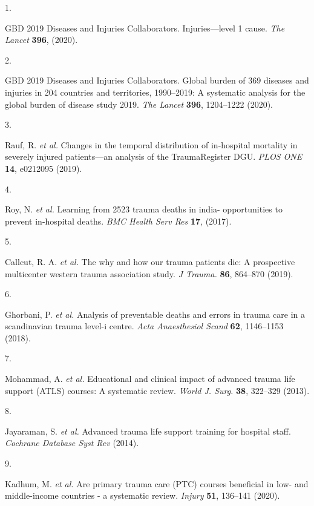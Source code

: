 \documentclass[
]{scrartcl}
\newlength{\cslhangindent}
\newlength{\csllabelwidth}
\newlength{\cslentryspacingunit} %
\newenvironment{CSLReferences}[2] %
 {%
  \setlength{\parindent}{0pt}
  \ifodd #1
  \let\oldpar\par
  \def\par{\hangindent=\cslhangindent\oldpar}
  \fi
  \setlength{\parskip}{#2\cslentryspacingunit}
 }%
 {}
\newcommand{\CSLLeftMargin}[1]{\parbox[t]{\csllabelwidth}{#1}}
\newcommand{\CSLRightInline}[1]{\parbox[t]{\linewidth - \csllabelwidth}{#1}\break}
\begin{document}
\hypertarget{refs}{}
\begin{CSLReferences}{0}{0}
\leavevmode{}%
\CSLLeftMargin{1. }%
\CSLRightInline{GBD 2019 Diseases and Injuries Collaborators.
Injuries---level 1 cause. \emph{The Lancet} \textbf{396}, (2020).}

\leavevmode{}%
\CSLLeftMargin{2. }%
\CSLRightInline{GBD 2019 Diseases and Injuries Collaborators. Global
burden of 369 diseases and injuries in 204 countries and territories,
1990--2019: A systematic analysis for the global burden of disease study
2019. \emph{The Lancet} \textbf{396}, 1204--1222 (2020).}

\leavevmode{}%
\CSLLeftMargin{3. }%
\CSLRightInline{Rauf, R. \emph{et al.} Changes in the temporal
distribution of in-hospital mortality in severely injured patients---an
analysis of the TraumaRegister DGU. \emph{PLOS ONE} \textbf{14},
e0212095 (2019).}

\leavevmode{}%
\CSLLeftMargin{4. }%
\CSLRightInline{Roy, N. \emph{et al.} Learning from 2523 trauma deaths
in india- opportunities to prevent in-hospital deaths. \emph{BMC Health
Serv Res} \textbf{17}, (2017).}

\leavevmode{}%
\CSLLeftMargin{5. }%
\CSLRightInline{Callcut, R. A. \emph{et al.} The why and how our trauma
patients die: A prospective multicenter western trauma association
study. \emph{J Trauma.} \textbf{86}, 864--870 (2019).}

\leavevmode{}%
\CSLLeftMargin{6. }%
\CSLRightInline{Ghorbani, P. \emph{et al.} Analysis of preventable
deaths and errors in trauma care in a scandinavian trauma level-i
centre. \emph{Acta Anaesthesiol Scand} \textbf{62}, 1146--1153 (2018).}

\leavevmode{}%
\CSLLeftMargin{7. }%
\CSLRightInline{Mohammad, A. \emph{et al.} Educational and clinical
impact of advanced trauma life support (ATLS) courses: A systematic
review. \emph{World J. Surg.} \textbf{38}, 322--329 (2013).}

\leavevmode{}%
\CSLLeftMargin{8. }%
\CSLRightInline{Jayaraman, S. \emph{et al.} Advanced trauma life support
training for hospital staff. \emph{Cochrane Database Syst Rev} (2014).}

\leavevmode{}%
\CSLLeftMargin{9. }%
\CSLRightInline{Kadhum, M. \emph{et al.} Are primary trauma care (PTC)
courses beneficial in low- and middle-income countries - a systematic
review. \emph{Injury} \textbf{51}, 136--141 (2020).}


\end{CSLReferences}
\end{document}
